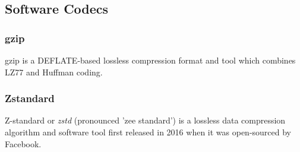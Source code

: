 \subsection{Software Codecs}

\subsubsection{gzip}
gzip is a DEFLATE-based lossless compression format and tool which combines LZ77 and Huffman coding.

\subsubsection{Zstandard}

Z-standard or \textit{zstd} (pronounced 'zee standard') is a lossless data compression algorithm and software tool first released in 2016 when it was open-sourced by Facebook.
